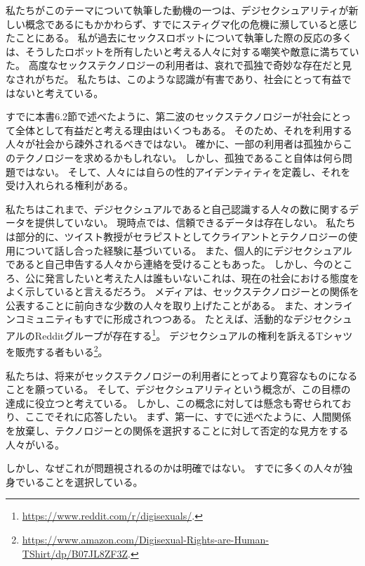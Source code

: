 \documentclass[paper=a4,book,openany]{jlreq} \usepackage{mystyle}
\begin{document}
私たちがこのテーマについて執筆した動機の一つは、デジセクシュアリティが新しい概念であるにもかかわらず、すでにスティグマ化の危機に瀕していると感じたことにある。
私が過去にセックスロボットについて執筆した際の反応の多くは、そうしたロボットを所有したいと考える人々に対する嘲笑や敵意に満ちていた。
高度なセックステクノロジーの利用者は、哀れで孤独で奇妙な存在だと見なされがちだ。
私たちは、このような認識が有害であり、社会にとって有益ではないと考えている。

すでに本書6.2節で述べたように、第二波のセックステクノロジーが社会にとって全体として有益だと考える理由はいくつもある。
そのため、それを利用する人々が社会から疎外されるべきではない。
確かに、一部の利用者は孤独からこのテクノロジーを求めるかもしれない。
しかし、孤独であること自体は何ら問題ではない。
そして、人々には自らの性的アイデンティティを定義し、それを受け入れられる権利がある。

私たちはこれまで、デジセクシュアルであると自己認識する人々の数に関するデータを提供していない。
現時点では、信頼できるデータは存在しない。
私たちは部分的に、ツイスト教授がセラピストとしてクライアントとテクノロジーの使用について話し合った経験に基づいている。
また、個人的にデジセクシュアルであると自己申告する人々から連絡を受けることもあった。
しかし、今のところ、公に発言したいと考えた人は誰もいない{\DDASH}これは、現在の社会における態度をよく示していると言えるだろう。
メディアは、セックステクノロジーとの関係を公表することに前向きな少数の人々を取り上げたことがある\citep{haas17:_chines_man_marries_robot_he_built_himsel,jozuka18:_beyon_dimen,weiss19:_these_men_love_their_sex}。
また、オンラインコミュニティもすでに形成されつつある。
たとえば、活動的なデジセクシュアルのRedditグループが存在する\footnote{\url{https://www.reddit.com/r/digisexuals/}.}。
デジセクシュアルの権利を訴えるTシャツを販売する者もいる\footnote{\url{https://www.amazon.com/Digisexual-Rights-are-Human-TShirt/dp/B07JL8ZF3Z}.}。

私たちは、将来がセックステクノロジーの利用者にとってより寛容なものになることを願っている。
そして、デジセクシュアリティという概念が、この目標の達成に役立つと考えている。
しかし、この概念に対しては懸念も寄せられており、ここでそれに応答したい。
まず、第一に、すでに述べたように、人間関係を放棄し、テクノロジーとの関係を選択することに対して否定的な見方をする人々がいる。

しかし、なぜこれが問題視されるのかは明確ではない。
すでに多くの人々が独身でいることを選択している\citep{depaulo17:_how_many_americ_want_be_singl}。
\end{document}
